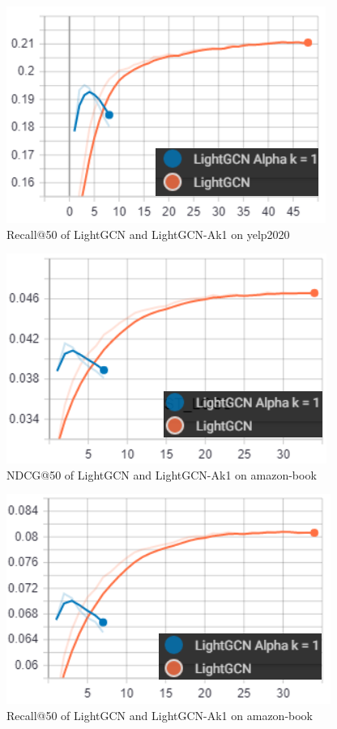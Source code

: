 \begin{figure}
    \includegraphics[width=\linewidth]{figures/alpha-k-results/yelp2020-recall.png}
    \caption{Recall@50 of LightGCN and LightGCN-Ak1 on yelp2020}
    \label{fig:recall-yelp2020-alpha-k}
\end{figure}
\begin{figure}
    \includegraphics[width=\linewidth]{figures/alpha-k-results/amazon-ndcg.png}
    \caption{NDCG@50 of LightGCN and LightGCN-Ak1 on amazon-book}
    \label{fig:ndcg-amazon-alpha-k}
\end{figure}
\begin{figure}
    \includegraphics[width=\linewidth]{figures/alpha-k-results/amazon-recall.png}
    \caption{Recall@50 of LightGCN and LightGCN-Ak1 on amazon-book}
    \label{fig:recall-amazon-alpha-k}
\end{figure}
